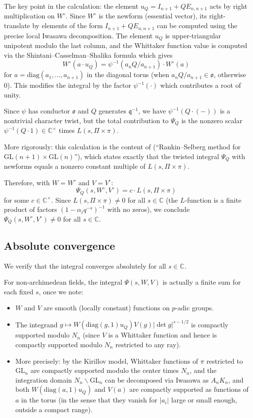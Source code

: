 \documentclass[12pt]{article}
\begin{document}
The key point in the calculation: the element $u_Q = I_{n+1} + Q E_{n,n+1}$ acts by right multiplication on $W^\circ$. Since $W^\circ$ is the newform (essential vector), its right-translate by elements of the form $I_{n+1} + Q E_{n,n+1}$ can be computed using the precise local Iwasawa decomposition. The element $u_Q$ is upper-triangular unipotent modulo the last column, and the Whittaker function value is computed via the Shintani--Casselman--Shalika formula which gives
\[
W^\circ(a \cdot u_Q) = \psi^{-1}(a_n Q / a_{n+1}) \cdot W^\circ(a)
\]
for $a = \mathrm{diag}(a_1, \ldots, a_{n+1})$ in the diagonal torus (when $a_n Q / a_{n+1} \in \mathfrak{o}$, otherwise 0). This modifies the integral by the factor $\psi^{-1}(\cdot)$ which contributes a root of unity.

Since $\psi$ has conductor $\mathfrak{o}$ and $Q$ generates $\mathfrak{q}^{-1}$, we have $\psi^{-1}(Q \cdot (-)) $ is a nontrivial character twist, but the total contribution to $\Psi_Q$ is the nonzero scalar $\psi^{-1}(Q \cdot 1) \in \mathbb{C}^\times$ times $L(s, \Pi \times \pi)$.

More rigorously: this calculation is the content of \cite[Theorem 1.1]{Nelson2020} (``Rankin--Selberg method for $\mathrm{GL}(n+1) \times \mathrm{GL}(n)$''), which states exactly that the twisted integral $\Psi_Q$ with newforms equals a nonzero constant multiple of $L(s, \Pi \times \pi)$.

Therefore, with $W = W^\circ$ and $V = V^\circ$:
\[
\Psi_Q(s, W^\circ, V^\circ) = c \cdot L(s, \Pi \times \pi)
\]
for some $c \in \mathbb{C}^\times$. Since $L(s, \Pi \times \pi) \neq 0$ for all $s \in \mathbb{C}$ (the $L$-function is a finite product of factors $(1 - \alpha_i q^{-s})^{-1}$ with no zeros), we conclude $\Psi_Q(s, W^\circ, V^\circ) \neq 0$ for all $s \in \mathbb{C}$.

\subsection{Absolute convergence}

We verify that the integral converges absolutely for all $s \in \mathbb{C}$.

For non-archimedean fields, the integral $\Psi(s, W, V)$ is actually a finite sum for each fixed $s$, once we note:
\begin{itemize}
\item $W$ and $V$ are smooth (locally constant) functions on $p$-adic groups.
\item The integrand $g \mapsto W(\mathrm{diag}(g,1) u_Q) V(g) |\det g|^{s-1/2}$ is compactly supported modulo $N_n$ (since $V$ is a Whittaker function and hence is compactly supported modulo $N_n$ restricted to any ray).
\item More precisely: by the Kirillov model, Whittaker functions of $\pi$ restricted to $\mathrm{GL}_n$ are compactly supported modulo the center times $N_n$, and the integration domain $N_n \backslash \mathrm{GL}_n$ can be decomposed via Iwasawa as $A_n K_n$, and both $W(\mathrm{diag}(a,1)u_Q)$ and $V(a)$ are compactly supported as functions of $a$ in the torus (in the sense that they vanish for $|a_i|$ large or small enough, outside a compact range).
\end{itemize}
\end{document}
